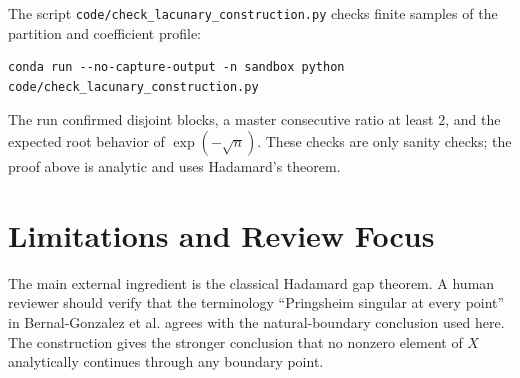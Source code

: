 \documentclass[11pt]{article}
\theoremstyle{remark}
\begin{document}
The script \texttt{code/check\_lacunary\_construction.py} checks finite
samples of the partition and coefficient profile:

\begin{verbatim}
conda run --no-capture-output -n sandbox python code/check_lacunary_construction.py
\end{verbatim}

The run confirmed disjoint blocks, a master consecutive ratio at least \(2\),
and the expected root behavior of \(\exp(-\sqrt n)\).  These checks are only
sanity checks; the proof above is analytic and uses Hadamard's theorem.

\section{Limitations and Review Focus}

The main external ingredient is the classical Hadamard gap theorem.  A human
reviewer should verify that the terminology ``Pringsheim singular at every
point'' in Bernal-Gonzalez et al. agrees with the natural-boundary conclusion
used here.  The construction gives the stronger conclusion that no nonzero
element of \(X\) analytically continues through any boundary point.
\end{document}
